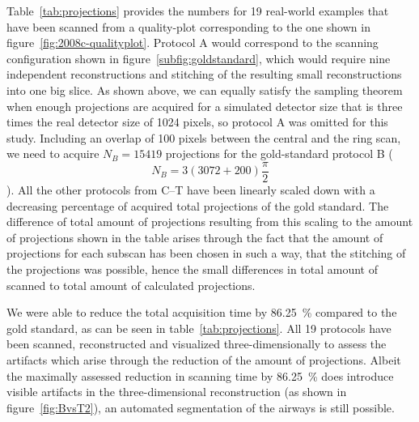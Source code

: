 \cbstart
Table~\ref{tab:projections} provides the numbers for 19 real-world examples that have been scanned from a quality-plot corresponding to the one shown in figure~\ref{fig:2008c-qualityplot}. Protocol A would correspond to the scanning configuration shown in figure~\ref{subfig:goldstandard}, which would require nine independent reconstructions and stitching of the resulting small reconstructions into one big slice. As shown above, we can equally satisfy the sampling theorem when enough projections are acquired for a simulated detector size that is three times the real detector size of 1024 pixels, so protocol A was omitted for this study. Including an overlap of 100 pixels between the central and the ring scan, we need to acquire $N_{B}=15419$ projections for the gold-standard protocol B (\[N_{B}=3(3072+200)\frac{\pi}{2}\]). All the other protocols from C--T have been linearly scaled down with a decreasing percentage of acquired total projections of the gold standard. The difference of total amount of projections resulting from this scaling to the amount of projections shown in the table arises through the fact that the amount of projections for each subscan has been chosen in such a way, that the stitching of the projections was possible, hence the small differences in total amount of scanned to total amount of calculated projections.

We were able to reduce the total acquisition time by \SI{86.25}{\percent} compared to the gold standard, as can be seen in table~\ref{tab:projections}. All 19 protocols have been scanned, reconstructed and visualized three-dimensionally to assess the artifacts which arise through the reduction of the amount of projections. Albeit the maximally assessed reduction in scanning time by \SI{86.25}{\percent} does introduce visible artifacts in the three-dimensional reconstruction (as shown in figure~\ref{fig:BvsT2}), an automated segmentation of the airways is still possible.
\cbend

